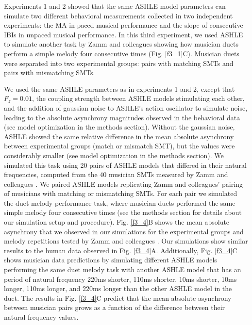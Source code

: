 \documentclass{report}
\begin{document}
Experiments 1 and 2 showed that the same ASHLE model parameters can simulate two different behavioral measurements collected in two independent experiments: the MA in paced musical performance and the slope of consecutive IBIs in unpaced musical performance. In this third experiment, we used ASHLE to simulate another task by Zamm and colleagues \cite{zamm2016endogenous} showing how musician duets perform a simple melody four consecutive times (Fig.{} \ref{f3_1}C). Musician duets were separated into two experimental groups: pairs with matching SMTs and pairs with mismatching SMTs. 

We used the same ASHLE parameters as in experiments 1 and 2, except that $F_z = 0.01$, the coupling strength between ASHLE models stimulating each other, and the addition of gaussian noise to ASHLE's action oscillator to simulate noise, leading to the absolute asynchrony magnitudes observed in the behavioral data (see model optimization in the methods section). Without the gaussian noise, ASHLE showed the same relative difference in the mean absolute asynchrony between experimental groups (match or mismatch SMT), but the values were considerably smaller (see model optimization in the methods section). We simulated this task using 20 pairs of ASHLE models that differed in their natural frequencies, computed from the 40 musician SMTs measured by Zamm and colleagues \cite{zamm2016endogenous}. We paired ASHLE models replicating Zamm and colleagues' \cite{zamm2016endogenous} pairing of musicians with matching or mismatching SMTs. For each pair we simulated the duet melody performance task, where musician duets performed the same simple melody four consecutive times (see the methods section for details about our simulation setup and procedure). Fig.{} \ref{f3_4}B shows the mean absolute asynchrony that we observed in our simulations for the experimental groups and melody repetitions tested by Zamm and colleagues \cite{zamm2016endogenous}. Our simulations show similar results to the human data observed in Fig.{} \ref{f3_4}A. Additionally, Fig.{} \ref{f3_4}C shows musician data predictions by simulating different ASHLE models performing the same duet melody task with another ASHLE model that has an period of natural frequency 220ms shorter, 110ms shorter, 10ms shorter, 10ms longer, 110ms longer, and 220ms longer than the other ASHLE model in the duet. The results in Fig.{} \ref{f3_4}C predict that the mean absolute asynchrony between musician pairs grows as a function of the difference between their natural frequency values. 
\end{document}
